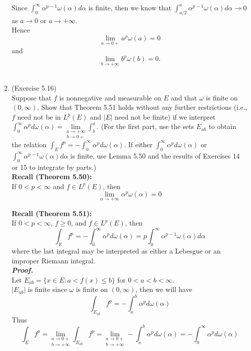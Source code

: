 \documentclass[a4paper,11pt]{article}
\begin{document}
\begin{enumerate}
 Since $\int_{0}^{\infty} \alpha^{p-1} \omega(\alpha) d\alpha$ is finite, then we know that $\int_{a/2}^{a} \alpha^{p-1} \omega (\alpha) d \alpha \to 0$ as $a \to 0$ or $a \to +\infty$.\\
 Hence
 $$\underset{a \to 0+}{\lim} a^p \omega(a) = 0$$
 and
 $$\underset{b \to +\infty}{\lim} b^p \omega(b) = 0.$$\\






\item (Exercise 5.16)\\
 Suppose that $f$ is nonnegative and measurable on $E$ and that $\omega$ is finite on $(0, \infty)$. Show that Theorem 5.51 holds without any further restrictions (i.e., $f$ need not be in $L^p(E)$ and $|E|$ need not be finite) if we interpret $\int_0^\infty \alpha^p d\omega(\alpha) = \underset{b \to 0+}{ \underset{a \to +\infty}{\lim}} \int_b^a$. (For the first part, use the sets $E_{ab}$ to obtain the relation $\int_E f^p = - \int_{0}^{\infty} \alpha^p d\omega(\alpha)$. If either $\int_0^\infty \alpha^p d\omega(\alpha)$ or $\int_0^\infty \alpha^{p-1} \omega(\alpha) d\alpha$ is finite, use Lemma 5.50 and the results of Exercises 14 or 15 to integrate by parts.)\\
 

 \textbf{Recall (Theorem 5.50):}\\
 If $0 < p < \infty$ and $f \in L^p(E)$, then
 $$\underset{\alpha \to +\infty}{\lim} \alpha^p \omega(\alpha) = 0$$

 \textbf{Recall (Theorem 5.51):}\\
 If $0 < p < \infty$, $f \geq 0$, and $f \in L^p(E)$, then
 $$\int_E f^p = - \int_0^\infty \alpha^p d \omega(\alpha) = p \int_0^\infty \alpha^{p-1} \omega(\alpha) d \alpha$$
 where the last integral may be interpreted as either a Lebesgue or an improper Riemann integral.\\
 \newline
 \textit{\textbf {Proof.}}\\

 Let $E_{ab} = \{ x \in E : a < f(x) \leq b \}$ for $0 < a < b < \infty$.\\
 $|E_{ab}|$ is finite since $\omega$ is finite on $(0,\infty)$, then we will have
 $$\int_{E_{ab}} f^p = -\int_a^b \alpha^p d \omega(\alpha)$$
 Thus
 $$\int_E f^p
 = \underset{b \to +\infty}{\underset{a \to 0+}{\lim}} \int_{E_{ab}} f^p 
 = \underset{b \to +\infty}{\underset{a \to 0+}{\lim}} -\int_a^b \alpha^p d \omega(\alpha)
 = - \int_0^\infty \alpha^p d \omega(\alpha)$$


\end{enumerate}
\end{document}
